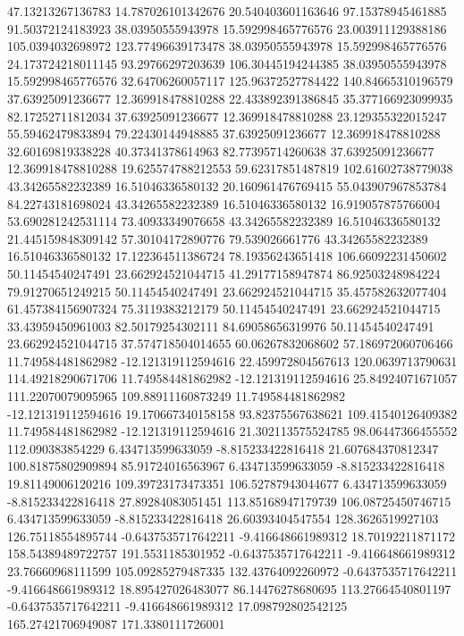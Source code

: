 47.13213267136783 14.787026101342676 20.540403601163646 97.15378945461885 91.50372124183923
38.03950555943978 15.592998465776576 23.003911129388186 105.0394032698972 123.77496639173478
38.03950555943978 15.592998465776576 24.173724218011145 93.29766297203639 106.30445194244385
38.03950555943978 15.592998465776576 32.64706260057117 125.96372527784422 140.84665310196579
37.63925091236677 12.369918478810288 22.433892391386845 35.377166923099935 82.17252711812034
37.63925091236677 12.369918478810288 23.129355322015247 55.59462479833894 79.22430144948885
37.63925091236677 12.369918478810288 32.60169819338228 40.37341378614963 82.77395714260638
37.63925091236677 12.369918478810288 19.625574788212553 59.62317851487819 102.61602738779038
43.34265582232389 16.51046336580132 20.160961476769415 55.043907967853784 84.22743181698024
43.34265582232389 16.51046336580132 16.919057875766004 53.690281242531114 73.40933349076658
43.34265582232389 16.51046336580132 21.445159848309142 57.30104172890776 79.539026661776
43.34265582232389 16.51046336580132 17.122364511386724 78.19356243651418 106.66092231450602
50.11454540247491 23.662924521044715 41.29177158947874 86.92503248984224 79.91270651249215
50.11454540247491 23.662924521044715 35.457582632077404 61.457384156907324 75.3119383212179
50.11454540247491 23.662924521044715 33.43959450961003 82.50179254302111 84.69058656319976
50.11454540247491 23.662924521044715 37.574718504014655 60.06267832068602 57.186972060706466
11.749584481862982 -12.121319112594616 22.459972804567613 120.0639713790631 114.49218290671706
11.749584481862982 -12.121319112594616 25.84924071671057 111.22070079095965 109.88911160873249
11.749584481862982 -12.121319112594616 19.170667340158158 93.82375567638621 109.41540126409382
11.749584481862982 -12.121319112594616 21.302113575524785 98.06447366455552 112.090383854229
6.434713599633059 -8.815233422816418 21.607684370812347 100.81875802909894 85.91724016563967
6.434713599633059 -8.815233422816418 19.81149006120216 109.39723173473351 106.52787943044677
6.434713599633059 -8.815233422816418 27.89284083051451 113.85168947179739 106.08725450746715
6.434713599633059 -8.815233422816418 26.60393404547554 128.3626519927103 126.75118554895744
-0.6437535717642211 -9.416648661989312 18.70192211871172 158.54389489722757 191.5531185301952
-0.6437535717642211 -9.416648661989312 23.76660968111599 105.09285279487335 132.43764092260972
-0.6437535717642211 -9.416648661989312 18.895427026483077 86.14476278680695 113.27664540801197
-0.6437535717642211 -9.416648661989312 17.098792802542125 165.27421706949087 171.3380111726001
